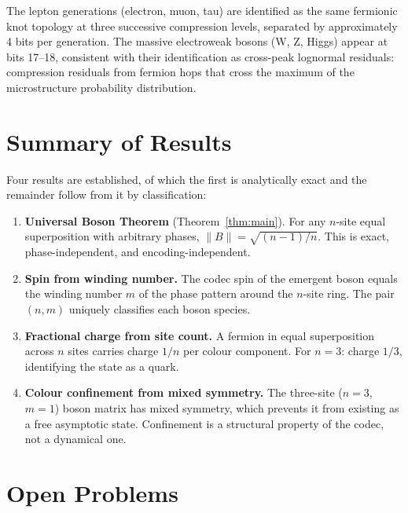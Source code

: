 \documentclass[11pt]{article}
\begin{document}
The lepton generations (electron, muon, tau) are identified as the same
fermionic knot topology at three successive compression levels, separated
by approximately 4 bits per generation.
The massive electroweak bosons (W, Z, Higgs) appear at bits 17--18,
consistent with their identification as cross-peak lognormal residuals:
compression residuals from fermion hops that cross the maximum of the
microstructure probability distribution.

\section{Summary of Results}
\label{sec:results}

Four results are established, of which the first is analytically exact
and the remainder follow from it by classification:

\begin{enumerate}
\item \textbf{Universal Boson Theorem} (Theorem~\ref{thm:main}).
  For any $n$-site equal superposition with arbitrary phases,
  $\|B\| = \sqrt{(n-1)/n}$.
  This is exact, phase-independent, and encoding-independent.

\item \textbf{Spin from winding number.}
  The codec spin of the emergent boson equals the winding number $m$
  of the phase pattern around the $n$-site ring.
  The pair $(n, m)$ uniquely classifies each boson species.

\item \textbf{Fractional charge from site count.}
  A fermion in equal superposition across $n$ sites carries charge $1/n$
  per colour component.
  For $n = 3$: charge $1/3$, identifying the state as a quark.

\item \textbf{Colour confinement from mixed symmetry.}
  The three-site ($n=3$, $m=1$) boson matrix has mixed symmetry, which
  prevents it from existing as a free asymptotic state.
  Confinement is a structural property of the codec, not a dynamical one.
\end{enumerate}

\section{Open Problems}
\label{sec:open}
\end{document}
